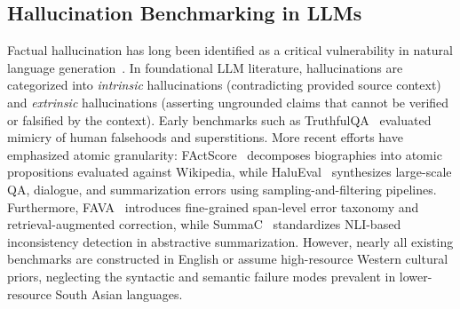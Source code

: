 \documentclass[11pt,a4paper,twocolumn]{article}
\begin{document}
\subsection{Hallucination Benchmarking in LLMs}
Factual hallucination has long been identified as a critical vulnerability in natural language generation~\citep{maynez2020faithfulness,ji2023survey}. In foundational LLM literature, hallucinations are categorized into \emph{intrinsic} hallucinations (contradicting provided source context) and \emph{extrinsic} hallucinations (asserting ungrounded claims that cannot be verified or falsified by the context). Early benchmarks such as TruthfulQA~\citep{lin2022truthfulqa} evaluated mimicry of human falsehoods and superstitions. More recent efforts have emphasized atomic granularity: FActScore~\citep{min2023factscore} decomposes biographies into atomic propositions evaluated against Wikipedia, while HaluEval~\citep{li2023halueval} synthesizes large-scale QA, dialogue, and summarization errors using sampling-and-filtering pipelines. Furthermore, FAVA~\citep{mishra2024fava} introduces fine-grained span-level error taxonomy and retrieval-augmented correction, while SummaC~\citep{laban2022summac} standardizes NLI-based inconsistency detection in abstractive summarization. However, nearly all existing benchmarks are constructed in English or assume high-resource Western cultural priors, neglecting the syntactic and semantic failure modes prevalent in lower-resource South Asian languages.
\end{document}
